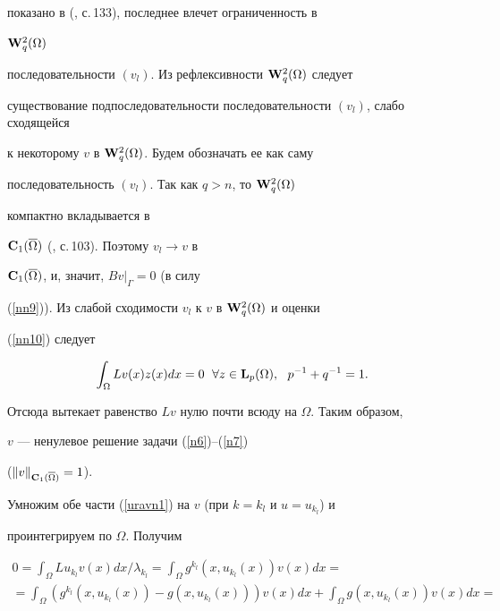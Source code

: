 \begin{pf}
показано в (\cite{agmon}, с.\,133), последнее влечет ограниченность в 


${\bold W}_q^2(\Omega)$


последовательности $(v_l)$. Из рефлексивности ${\bold W}_q^2(\Omega)$ следует


существование подпоследовательности последовательности $(v_l)$, слабо сходящейся


к некоторому $v$ в ${\bold W}_q^2(\Omega)$. Будем обозначать ее как саму


последовательность $(v_l)$. Так как $q>n$, то ${\bold W}_q^2(\Omega)$ 


компактно вкладывается в


${\bold C}_1(\overline{\Omega})$ (\cite{sob}, с.\,103). Поэтому $v_l\to v$ в


${\bold C}_1(\overline{\Omega})$, и, значит, $Bv|_{\Gamma}=0$ (в силу


(\ref{nn9})). Из слабой сходимости $v_l$ к $v$ в ${\bold W}_q^2(\Omega)$ и оценки


(\ref{nn10}) следует


$$


\int_{\Omega}Lv(x)z(x)dx=0 \ \; \forall z\in {\bold L}_p(\Omega),


\ \ p^{-1}+q^{-1}=1.


$$


Отсюда вытекает равенство $Lv$ нулю почти всюду на $\Omega$. Таким образом,


$v$ --- ненулевое решение задачи (\ref{n6})--(\ref{n7})


($\|v\|_{{\bold C}_1(\overline{\Omega})}=1$).





Умножим обе части (\ref{uravn1}) на $v$ (при $k=k_l$ и $u=u_{k_l}$) и


проинтегрируем по $\Omega$. Получим


\begin{multline}


0=\int_{\Omega}Lu_{k_l}v(x)dx/\lambda_{k_l}=


\int_{\Omega}g^{k_l}(x, u_{k_l}(x))v(x)dx= \\


%


=\int_{\Omega}(g^{k_l}(x, u_{k_l}(x))-g(x, u_{k_l}(x)))v(x)dx+


\int_{\Omega}g(x, u_{k_l}(x))v(x)dx= \\


%



\end{multline}
\end{pf}
